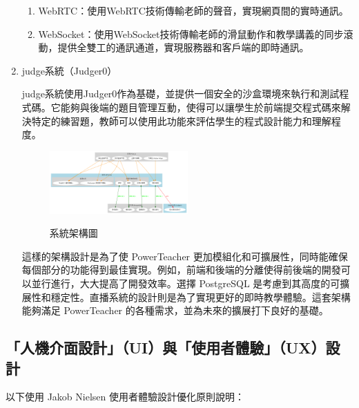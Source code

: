 \documentclass[12pt]{article}
\begin{document}
\begin{enumerate}[label=(\arabic*)]
  \begin{enumerate}[label=\textbullet, noitemsep]
    \item WebRTC：使用WebRTC技術傳輸老師的聲音，實現網頁間的實時通訊。
    \item WebSocket：使用WebSocket技術傳輸老師的滑鼠動作和教學講義的同步滾動，提供全雙工的通訊通道，實現服務器和客戶端的即時通訊。
  \end{enumerate}

  \item judge系統（Judger0）
  \par judge系統使用Judger0作為基礎，並提供一個安全的沙盒環境來執行和測試程式碼。它能夠與後端的題目管理互動，使得可以讓學生於前端提交程式碼來解決特定的練習題，教師可以使用此功能來評估學生的程式設計能力和理解程度。\\

  \begin{figure}[htb]
    \centering
    \href{https://raw.githubusercontent.com/programingtw/proglearn-plan/main/img/powerteacherarc.png}{
      \includegraphics[width=0.5\textwidth]{../img/powerteacherarc.png}
    }
    \caption{系統架構圖}
    \label{arc1}            
  \end{figure}

  這樣的架構設計是為了使 PowerTeacher 更加模組化和可擴展性，同時能確保每個部分的功能得到最佳實現。例如，前端和後端的分離使得前後端的開發可以並行進行，大大提高了開發效率。選擇 PostgreSQL 是考慮到其高度的可擴展性和穩定性。直播系統的設計則是為了實現更好的即時教學體驗。這套架構能夠滿足 PowerTeacher 的各種需求，並為未來的擴展打下良好的基礎。

\end{enumerate}

\subsection{「人機介面設計」（UI）與「使用者體驗」（UX）設計}
以下使用 Jakob Nielsen 使用者體驗設計優化原則說明：
\end{document}
